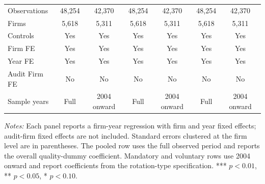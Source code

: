 \documentclass[10pt]{article}
\begin{document}
\begin{minipage}{19cm}
\begin{threeparttable}
\begin{tabular}{l cc cc cc}
Observations & 48,254 & 42,370 & 48,254 & 42,370 & 48,254 & 42,370 \\
Firms & 5,618 & 5,311 & 5,618 & 5,311 & 5,618 & 5,311 \\
\midrule
Controls & Yes & Yes & Yes & Yes & Yes & Yes \\
Firm FE & Yes & Yes & Yes & Yes & Yes & Yes \\
Year FE & Yes & Yes & Yes & Yes & Yes & Yes \\
Audit Firm FE & No & No & No & No & No & No \\
Sample years & Full & 2004 onward & Full & 2004 onward & Full & 2004 onward \\
\bottomrule
\end{tabular}
\begin{tablenotes}\fontsize{9}{11}\selectfont
\item \fontsize{9}{11}\selectfont \textit{Notes:} Each panel reports a firm-year regression with firm and year fixed effects; audit-firm fixed effects are not included. Standard errors clustered at the firm level are in parentheses. The pooled row uses the full observed period and reports the overall quality-dummy coefficient. Mandatory and voluntary rows use 2004 onward and report coefficients from the rotation-type specification. *** \(p<0.01\), ** \(p<0.05\), * \(p<0.10\).
\end{tablenotes}
\end{threeparttable}

\end{minipage}
\end{document}
